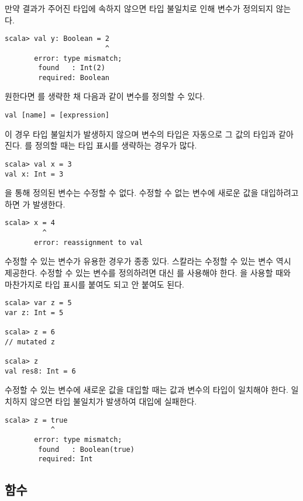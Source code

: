 만약 결과가 주어진 타입에 속하지 않으면 타입 불일치로 인해 변수가 정의되지
않는다.

\begin{verbatim}
scala> val y: Boolean = 2
                        ^
       error: type mismatch;
        found   : Int(2)
        required: Boolean
\end{verbatim}

원한다면 를 생략한 채 다음과 같이 변수를 정의할 수 있다.

\begin{verbatim}
val [name] = [expression]
\end{verbatim}

이 경우 타입 불일치가 발생하지 않으며 변수의 타입은 자동으로 그 값의 타입과
같아진다. 를 정의할 때는 타입 표시를
생략하는 경우가 많다.

\begin{verbatim}
scala> val x = 3
val x: Int = 3
\end{verbatim}

을 통해 정의된 변수는 수정할 수 없다. 수정할 수 없는 변수에 새로운 값을
대입하려고 하면 가 발생한다.

\begin{verbatim}
scala> x = 4
         ^
       error: reassignment to val
\end{verbatim}

수정할 수 있는 변수가 유용한 경우가 종종 있다. 스칼라는 수정할 수 있는 변수 역시
제공한다. 수정할 수 있는 변수를 정의하려면  대신 를 사용해야
한다. 을
사용할 때와 마찬가지로 타입 표시를 붙여도 되고 안 붙여도 된다.

\begin{verbatim}
scala> var z = 5
var z: Int = 5

scala> z = 6
// mutated z

scala> z
val res8: Int = 6
\end{verbatim}

수정할 수 있는 변수에 새로운 값을 대입할 때는 값과 변수의 타입이 일치해야 한다.
일치하지 않으면 타입 불일치가 발생하여 대입에 실패한다.

\begin{verbatim}
scala> z = true
           ^
       error: type mismatch;
        found   : Boolean(true)
        required: Int
\end{verbatim}

\subsection{함수}

